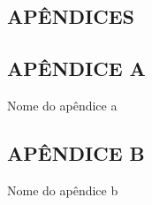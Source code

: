 \begin{center}
    \section*{APÊNDICES}
\end{center}

\newpage
{}
\begin{center}
    \section*{APÊNDICE A}
    Nome do apêndice a
\end{center}

\newpage
{}
\begin{center}
    \section*{APÊNDICE B}
    Nome do apêndice b
\end{center}